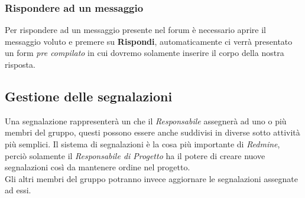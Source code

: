 \documentclass{scalatekids-article}
\begin{document}
\subsubsection{Rispondere ad un messaggio}
Per rispondere ad un messaggio presente nel forum è necessario aprire il messaggio voluto e premere su \textbf{Rispondi}, automaticamente ci verrà presentato un form \textit{pre compilato} in cui dovremo solamente inserire il corpo della nostra risposta.
\subsection{Gestione delle segnalazioni}
Una segnalazione rappresenterà un  che il \textit{Responsabile} assegnerà ad uno o più membri del gruppo, questi  possono essere anche suddivisi in diverse sotto attività più semplici.
Il sistema di segnalazioni è la cosa più importante di \textit{Redmine}, perciò solamente il \textit{Responsabile di Progetto} ha il potere di creare nuove segnalazioni così da mantenere ordine nel progetto. \\Gli altri membri del gruppo potranno invece aggiornare le segnalazioni assegnate ad essi.
\end{document}
